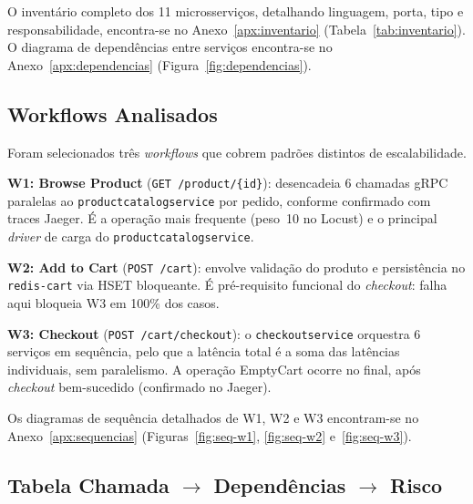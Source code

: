 \documentclass[manuscript,oneside]{acmart}
\begin{document}
O inventário completo dos 11 microsserviços, detalhando linguagem, porta, tipo e responsabilidade, encontra-se no Anexo~\ref{apx:inventario} (Tabela~\ref{tab:inventario}). O diagrama de dependências entre serviços encontra-se no Anexo~\ref{apx:dependencias} (Figura~\ref{fig:dependencias}).

\subsection{Workflows Analisados}

Foram selecionados três \textit{workflows} que cobrem padrões distintos de escalabilidade.

\textbf{W1: Browse Product} (\texttt{GET /product/\{id\}}): desencadeia 6 chamadas gRPC paralelas ao \texttt{productcatalogservice} por pedido, conforme confirmado com traces Jaeger. É a operação mais frequente (peso~10 no Locust) e o principal \textit{driver} de carga do \texttt{productcatalogservice}.

\textbf{W2: Add to Cart} (\texttt{POST /cart}): envolve validação do produto e persistência no \texttt{redis-cart} via HSET bloqueante. É pré-requisito funcional do \textit{checkout}: falha aqui bloqueia W3 em 100\% dos casos.

\textbf{W3: Checkout} (\texttt{POST /cart/checkout}): o \texttt{checkoutservice} orquestra 6 serviços em sequência, pelo que a latência total é a soma das latências individuais, sem paralelismo. A operação EmptyCart ocorre no final, após \textit{checkout} bem-sucedido (confirmado no Jaeger).

Os diagramas de sequência detalhados de W1, W2 e W3 encontram-se no Anexo~\ref{apx:sequencias} (Figuras~\ref{fig:seq-w1}, \ref{fig:seq-w2} e~\ref{fig:seq-w3}).

\subsection{Tabela Chamada $\rightarrow$ Dependências $\rightarrow$ Risco}
\end{document}
